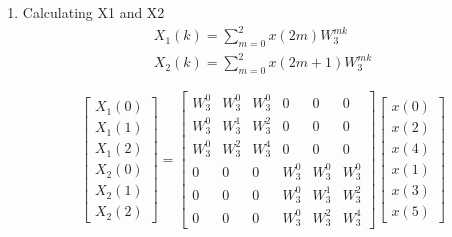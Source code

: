 \documentclass[journal,12pt,twocolumn]{IEEEtran}
\renewcommand\thesection{\arabic{section}}
\begin{document}
\begin{enumerate}[label=\thesection.\arabic*.,ref=\thesection.\theenumi]
\item Calculating X1 and X2
\begin{align}
    X_{1}(k) = \sum_{m=0}^{2} x(2m)W^{mk}_{3} \\
    X_{2}(k) = \sum_{m=0}^{2} x(2m+1)W^{mk}_{3}
\end{align}

\begin{equation}
\begin{bmatrix}
X_{1}(0) \\ 
X_{1}(1) \\ 
X_{1}(2) \\ 
X_{2}(0) \\ 
X_{2}(1) \\ 
X_{2}(2)
\end{bmatrix}
=
\begin{bmatrix}
W^{0}_{3} & W^{0}_{3} & W^{0}_{3} & 0 & 0 & 0\\
W^{0}_{3} & W^{1}_{3} & W^{2}_{3} & 0 & 0 & 0\\
W^{0}_{3} & W^{2}_{3} & W^{4}_{3} & 0 & 0 & 0\\
0 & 0 & 0 & W^{0}_{3} & W^{0}_{3} & W^{0}_{3}\\
0 & 0 & 0 & W^{0}_{3} & W^{1}_{3} & W^{2}_{3}\\
0 & 0 & 0 & W^{0}_{3} & W^{2}_{3} & W^{4}_{3}

\end{bmatrix}
\begin{bmatrix}
x(0) \\ 
x(2) \\ 
x(4) \\ 
x(1) \\ 
x(3) \\ 
x(5) 
\end{bmatrix}   
\end{equation}


\end{enumerate}
\end{document}
